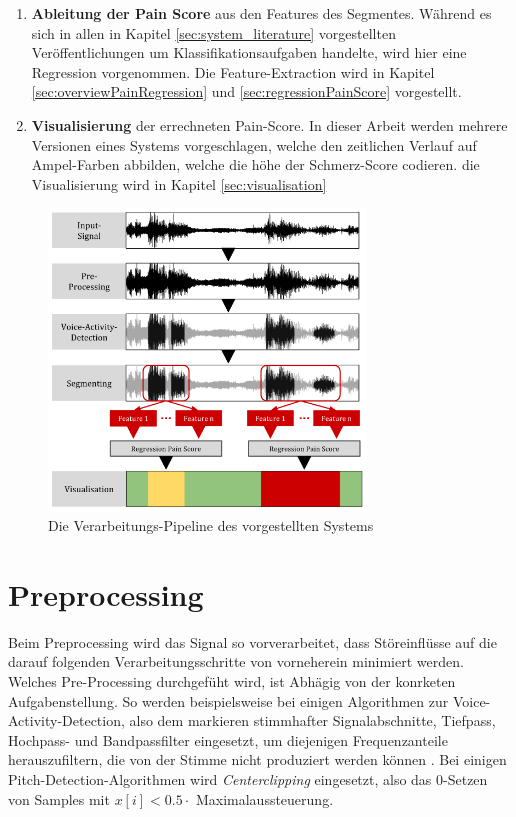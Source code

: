 \begin{enumerate}[leftmargin=*]
	\item \textbf{Ableitung der Pain Score} aus den Features des Segmentes. Während es sich in allen in Kapitel \ref{sec:system_literature} vorgestellten Veröffentlichungen um Klassifikationsaufgaben handelte, wird hier eine Regression vorgenommen. Die Feature-Extraction wird in Kapitel \ref{sec:overviewPainRegression} und \ref{sec:regressionPainScore} vorgestellt.
	
	\item \textbf{Visualisierung} der errechneten Pain-Score. In dieser Arbeit werden mehrere Versionen eines Systems vorgeschlagen, welche den zeitlichen Verlauf auf Ampel-Farben abbilden, welche die höhe der Schmerz-Score codieren. die Visualisierung wird in Kapitel \ref{sec:visualisation}	
\end{enumerate}

\begin{figure}[H]
	\centering
	\includegraphics[width=0.75\textwidth]{bilder/pipeline01.png}
	\caption{Die Verarbeitungs-Pipeline des vorgestellten Systems}
	\label{img:architecture-overview}
\end{figure}

\section{Preprocessing}
\label{sec:preprocessing}

Beim Preprocessing wird das Signal so vorverarbeitet, dass Störeinflüsse auf die darauf folgenden Verarbeitungsschritte von vorneherein minimiert werden. Welches Pre-Processing durchgefüht wird, ist Abhägig von der konrketen Aufgabenstellung. So werden beispielsweise bei einigen Algorithmen zur Voice-Activity-Detection, also dem markieren stimmhafter Signalabschnitte, Tiefpass, Hochpass- und Bandpassfilter eingesetzt, um diejenigen Frequenzanteile herauszufiltern, die von der Stimme nicht produziert werden können \cite{vad_entropy} \cite{vad_ceps} \cite{vad_kola}. Bei einigen Pitch-Detection-Algorithmen wird \emph{Centerclipping} eingesetzt, also das 0-Setzen von Samples mit $ x[i] < 0.5 \cdot $ Maximalaussteuerung.\cite{czechPitch} 

